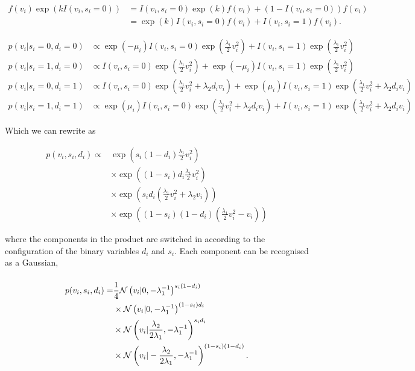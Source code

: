 \documentclass[
]{article}
\begin{document}
\[\begin{align*}
f(v_i)\exp\left( k I(v_i, s_i=0) \right) & = I(v_i, s_i=0)\exp(k)f(v_i) +  (1-I(v_i, s_i=0)) f(v_i) \\
& = \exp(k)I(v_i, s_i=0)f(v_i) + I(v_i, s_i=1) f(v_i).
\end{align*}\]

\[
\begin{align*}
p(v_i | s_i=0, d_i=0) & \propto \exp\left(-\mu_i\right) I(v_i, s_i=0)\exp\left(\frac{\lambda_1}{2} v_i^2\right) + I(v_i, s_i=1)\exp\left(\frac{\lambda_1}{2} v_i^2\right) \\
p(v_i | s_i=1, d_i=0) & \propto I(v_i, s_i=0)\exp\left(\frac{\lambda_1}{2} v_i^2\right) + \exp\left(-\mu_i\right) I(v_i, s_i=1)\exp\left(\frac{\lambda_1}{2} v_i^2\right)  \\
p(v_i | s_i=0, d_i=1) & \propto I(v_i, s_i=0)\exp\left(\frac{\lambda_1}{2} v_i^2 + \lambda_2 d_i v_i\right) + \exp(\mu_i)I(v_i, s_i=1)\exp\left(\frac{\lambda_1}{2} v_i^2 + \lambda_2 d_i v_i\right) \\
p(v_i | s_i=1, d_i=1) & \propto \exp(\mu_i)I(v_i, s_i=0)\exp\left(\frac{\lambda_1}{2} v_i^2 + \lambda_2 d_i v_i\right) + I(v_i, s_i=1)\exp\left(\frac{\lambda_1}{2} v_i^2 + \lambda_2 d_i v_i\right)
\end{align*}
\]

Which we can rewrite as

\[\begin{align*}
p(v_i, s_i, d_i) \propto & \exp\left( s_i (1-d_i) \frac{\lambda_1}{2}v_i^2\right) \\
& \times \exp\left((1-s_i)d_i \frac{\lambda_1}{2} v_i^2\right) \\
& \times \exp\left(s_i d_i \left(\frac{\lambda_1}{2} v_i^2 + \lambda_2 v_i\right)\right) \\
& \times \exp\left((1-s_i)(1-d_i) \left(\frac{\lambda_1}{2} v_i^2- v_i\right)\right)
\end{align*}\]

where the components in the product are switched in according to the
configuration of the binary variables \(d_i\) and \(s_i\). Each
component can be recognised as a Gaussian,

\(\newcommand{\gaussianDist}[3]{\mathcal{N}\left(#1|#2, #3\right)}\)
\[\begin{align*}
p(v_i, s_i, d_i) = & \frac{1}{4}\gaussianDist{v_i}{0}{-\lambda_1^{-1}}^{s_i (1-d_i)} \\
& \times \gaussianDist{v_i}{0}{-\lambda_1^{-1}}^{(1 -s_i) d_i} \\
& \times \gaussianDist{v_i}{\frac{\lambda_2}{2\lambda_1}}{-\lambda_1^{-1}}^{s_i d_i}\\
& \times \gaussianDist{v_i}{-\frac{\lambda_2}{2\lambda_1}}{-\lambda_1^{-1}}^{(1-s_i) (1-d_i)}.
\end{align*}\]
\end{document}
